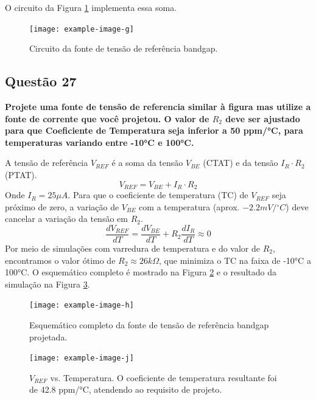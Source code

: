 ﻿\documentclass[12pt,a4paper]{article}
\newcommand{\degree}{\ensuremath{{}^\circ}}
\begin{document}
O circuito da Figura \ref{fig:bandgap_circuit} implementa essa soma.

\begin{figure}[H]
\centering
\texttt{[image: example-image-g]}
\caption{Circuito da fonte de tensão de referência bandgap.}
\label{fig:bandgap_circuit}
\end{figure}

\subsection*{Questão 27}
\textbf{Projete uma fonte de tensão de referencia similar à figura mas utilize a fonte de corrente que você projetou. O valor de $R_2$ deve ser ajustado para que Coeficiente de Temperatura seja inferior a 50 ppm/°C, para temperaturas variando entre -10°C e 100°C.}

A tensão de referência $V_{REF}$ é a soma da tensão $V_{BE}$ (CTAT) e da tensão $I_R \cdot R_2$ (PTAT).
$$V_{REF} = V_{BE} + I_R \cdot R_2$$
Onde $I_R = 25\mu A$. Para que o coeficiente de temperatura (TC) de $V_{REF}$ seja próximo de zero, a variação de $V_{BE}$ com a temperatura (aprox. $-2.2mV/\degree C$) deve cancelar a variação da tensão em $R_2$.
$$\frac{dV_{REF}}{dT} = \frac{dV_{BE}}{dT} + R_2 \frac{dI_R}{dT} \approx 0$$
Por meio de simulações com varredura de temperatura e do valor de $R_2$, encontramos o valor ótimo de $R_2 \approx 26k\Omega$, que minimiza o TC na faixa de -10°C a 100°C. O esquemático completo é mostrado na Figura \ref{fig:bandgap_complete_schematic} e o resultado da simulação na Figura \ref{fig:vref_vs_temp}.

\begin{figure}[H]
\centering
\texttt{[image: example-image-h]}
\caption{Esquemático completo da fonte de tensão de referência bandgap projetada.}
\label{fig:bandgap_complete_schematic}
\end{figure}

\begin{figure}[H]
\centering
\texttt{[image: example-image-j]}
\caption{$V_{REF}$ vs. Temperatura. O coeficiente de temperatura resultante foi de 42.8 ppm/°C, atendendo ao requisito de projeto.}
\label{fig:vref_vs_temp}
\end{figure}
\end{document}
